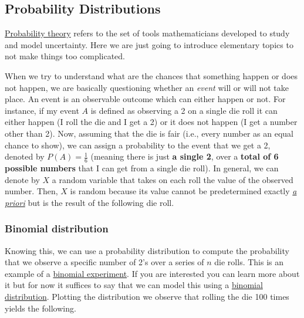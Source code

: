 \documentclass[
  letterpaper,
  DIV=11,
  numbers=noendperiod]{scrartcl}
\begin{document}
\subsection{Probability Distributions}\label{probability-distributions}

\href{https://en.wikipedia.org/wiki/Probability_theory}{Probability
theory} refers to the set of tools mathematicians developed to study and
model uncertainty. Here we are just going to introduce elementary topics
to not make things too complicated.

When we try to understand what are the chances that something happen or
does not happen, we are basically questioning whether an \emph{event}
will or will not take place. An event is an observable outcome which can
either happen or not. For instance, if my event \(A\) is defined as
observing a 2 on a single die roll it can either happen (I roll the die
and I get a 2) or it does not happen (I get a number other than 2). Now,
assuming that the die is fair (i.e., every number as an equal chance to
show), we can assign a probability to the event that we get a 2, denoted
by \(P(A) = \frac{1}{6}\) (meaning there is just \textbf{a single 2},
over a \textbf{total of 6 possible numbers} that I can get from a single
die roll). In general, we can denote by \(X\) a random variable that
takes on each roll the value of the observed number. Then, \(X\) is
random because its value cannot be predetermined exactly
\href{https://en.wikipedia.org/wiki/A_priori_and_a_posteriori}{\emph{a
priori}} but is the result of the following die roll.

\subsubsection{Binomial distribution}\label{binomial-distribution}

Knowing this, we can use a probability distribution to compute the
probability that we observe a specific number of 2's over a series of
\(n\) die rolls. This is an example of a
\href{https://www.statisticshowto.com/probability-and-statistics/binomial-theorem/binomial-experiment/}{binomial
experiment}. If you are interested you can learn more about it but for
now it suffices to say that we can model this using a
\href{https://en.wikipedia.org/wiki/Binomial_distribution}{binomial
distribution}. Plotting the distribution we observe that rolling the die
100 times yields the following.
\end{document}
